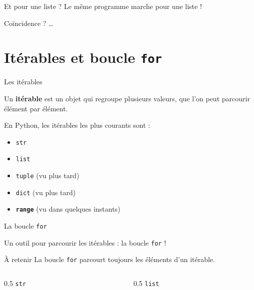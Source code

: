 \documentclass{beamer}
\begin{document}
\begin{frame}{Et pour une liste ?}
	Le même programme marche pour une liste !

	

	\pause
		\begin{center}
	\large Coïncidence ? \ldots \\[1pt]
	\onslide<3->{\textbf{Non, itérables !}}
\end{center}

\end{frame}

\section{Itérables et boucle \texttt{for}}

\begin{frame}{Les itérables}
	\begin{center}
		\Large Un \textbf{itérable} est un objet qui regroupe plusieurs valeurs, que l'on peut parcourir élément par élément.
	\end{center}

	\vspace{0.4cm}
	En Python, les itérables les plus courants sont :
	\begin{itemize}
		\item \texttt{str}
		\item \texttt{list}
		\item \texttt{tuple} {\small (vu plus tard)}
		\item \texttt{dict} {\small (vu plus tard)}
		\pause
		\item \textcolor{orange!85!black}{\textbf{\texttt{range}}} {\small (vu dans quelques instants)}
	\end{itemize}
\end{frame}


\begin{frame}{La boucle \texttt{for}}
	\begin{center}
		\Large Un outil pour parcourir les itérables : la boucle \texttt{for} !
	\end{center}

	\pause
	\begin{alertblock}{À retenir}
		\centering La boucle \texttt{for} parcourt toujours les \textcolor{red!70!black}{éléments} d'un itérable.
	\end{alertblock}

	\pause
	\begin{columns}[t]
		\begin{column}{0.5\textwidth}
			\centering \texttt{str}\\[4pt]
			
		\end{column}
		\begin{column}{0.5\textwidth}
			\centering \texttt{list}\\[4pt]
			
		\end{column}
	\end{columns}
\end{frame}
\end{document}
